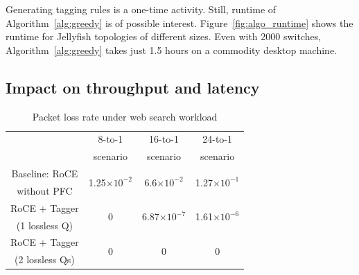 Generating tagging rules is a one-time activity. Still, runtime of
Algorithm~\ref{alg:greedy} is of possible interest.
Figure~\ref{fig:algo_runtime} shows the runtime for Jellyfish topologies of
different sizes. Even with 2000 switches, Algorithm~\ref{alg:greedy} takes
just 1.5 hours on a commodity desktop machine.


\subsection{Impact on throughput and latency}\label{subsec:exp_performanceoverhead}

\begin{table}[t]
	\footnotesize
	\centering
	\begin{tabular}{|c|c|c|c|}
		\hline
		& 8-to-1 & 16-to-1 & 24-to-1 \\
		&scenario & scenario & scenario \\
		\hline
		\hline
		
		Baseline: RoCE  & \multirow{2}{*}{1.25$\times 10^{-2}$} & \multirow{2}{*}{6.6$\times 10^{-2}$}  & \multirow{2}{*}{1.27$\times 10^{-1}$} \\
		without PFC &  &  & \\
		\hline
		
		RoCE + Tagger & \multirow{2}{*}{0} & \multirow{2}{*}{6.87$\times 10^{-7}$}  & \multirow{2}{*}{1.61$\times 10^{-6}$} \\
		(1 lossless Q) &  &  & \\
		\hline
		
		RoCE + Tagger & \multirow{2}{*}{0} & \multirow{2}{*}{0}  & \multirow{2}{*}{0} \\	
		(2 lossless Qs) &  &  & \\
		\hline
	\end{tabular}
	\caption{Packet loss rate under web search workload}
	\vspace{-2.5em}
	\label{table:loss_rate_ws} 
\end{table}


